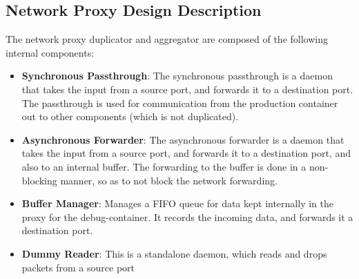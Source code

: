 

\subsection{Network Proxy Design Description}

The network proxy duplicator and aggregator are composed of the following internal components:

\begin{itemize}[leftmargin=*]
	\item \textbf{Synchronous Passthrough}: The synchronous passthrough is a daemon that takes the input from a source port, and forwards it to a destination port. The passthrough is used for communication from the production container out to other components (which is not duplicated).
	\item \textbf{Asynchronous Forwarder}: The asynchronous forwarder is a daemon that takes the input from a source port, and forwards it to a destination port, and also to an internal buffer. The forwarding to the buffer is done in a non-blocking manner, so as to not block the network forwarding. 
	\item \textbf{Buffer Manager}: Manages a FIFO queue for data kept internally in the proxy for the debug-container.
	It records the incoming data, and forwards it a destination port. 
	\item \textbf{Dummy Reader}: This is a standalone daemon, which reads and drops packets from a source port
\end{itemize}

\noindent






